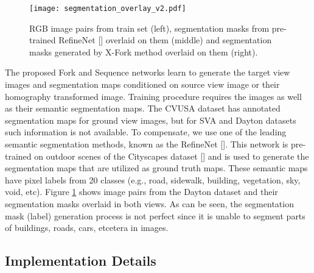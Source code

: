 \documentclass[times,twocolumn,final,authoryear]{elsarticle_modified}
\begin{document}
\begin{figure}
\centering
\texttt{[image: segmentation\_overlay\_v2.pdf]}
\vspace{-5pt}
\caption{\small \label{fig:overlay}RGB image pairs from train set (left), segmentation masks from pre-trained RefineNet [\cite{Lin:2017:RefineNet}] overlaid on them (middle) and segmentation masks generated by X-Fork method overlaid on them (right).}
  \vspace{-15pt}
\end{figure}


The proposed Fork and Sequence networks learn to generate the target view images and segmentation maps conditioned on source view image or their homography transformed image. Training procedure requires the images as well as their semantic segmentation maps. The CVUSA dataset has annotated segmentation maps for ground view images, but for SVA and Dayton datasets such information is not available. To compensate, we use one of the leading semantic segmentation methods, known as the RefineNet [\cite{Lin:2017:RefineNet}]. This network is pre-trained on outdoor scenes of the Cityscapes dataset [\cite{Cordts2016Cityscapes}] and is used to generate the segmentation maps that are utilized as ground truth maps. These semantic maps have pixel labels from 20 classes (e.g., road, sidewalk, building, vegetation, sky, void, etc). Figure \ref{fig:overlay} shows image pairs from the Dayton dataset and their segmentation masks overlaid in both views. As can be seen, the segmentation mask (label) generation process is not perfect since it is unable to segment parts of buildings, roads, cars, etcetera in images.




























\vspace{-5pt}
 
\subsection{Implementation Details} 
\end{document}
